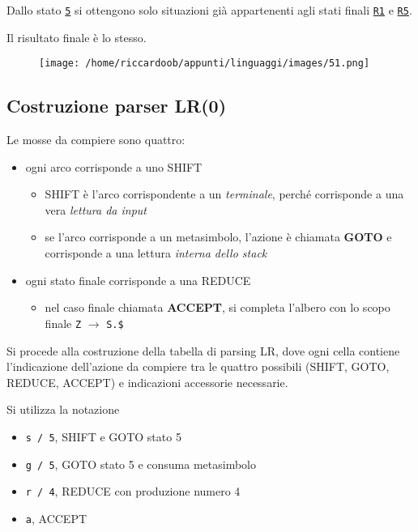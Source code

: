 Dallo stato \texttt{\underline{5}} si ottengono solo situazioni già appartenenti agli stati finali \texttt{\underline{R1}} e \texttt{\underline{R5}}.

Il risultato finale è lo stesso.
\begin{figure}[H]
    \centering
    \texttt{[image: /home/riccardoob/appunti/linguaggi/images/51.png]}
\end{figure}

\subsection{Costruzione parser LR(0)}
Le mosse da compiere sono quattro:
\begin{itemize}
    \item ogni arco corrisponde a uno SHIFT
    \begin{itemize}
        \item SHIFT è l'arco corrispondente a un \textit{terminale}, perché corrisponde a una vera \textit{lettura da input}
        \item se l'arco corrisponde a un metasimbolo, l'azione è chiamata \textbf{GOTO} e corrisponde a una lettura \textit{interna dello stack}
    \end{itemize}
    \item ogni stato finale corrisponde a una REDUCE
    \begin{itemize}
        \item nel caso finale chiamata \textbf{ACCEPT}, si completa l'albero con lo scopo finale \texttt{Z} $\rightarrow$ \texttt{S.\$}
    \end{itemize}
\end{itemize}

Si procede alla costruzione della tabella di parsing LR, dove ogni cella contiene l'indicazione dell'azione da compiere tra le quattro possibili (SHIFT, GOTO, REDUCE, ACCEPT) e indicazioni accessorie necessarie.

Si utilizza la notazione
\begin{itemize}
    \item \texttt{s / 5}, SHIFT e GOTO stato 5
    \item \texttt{g / 5}, GOTO stato 5 e consuma metasimbolo
    \item \texttt{r / 4}, REDUCE con produzione numero 4
    \item \texttt{a}, ACCEPT
\end{itemize}


